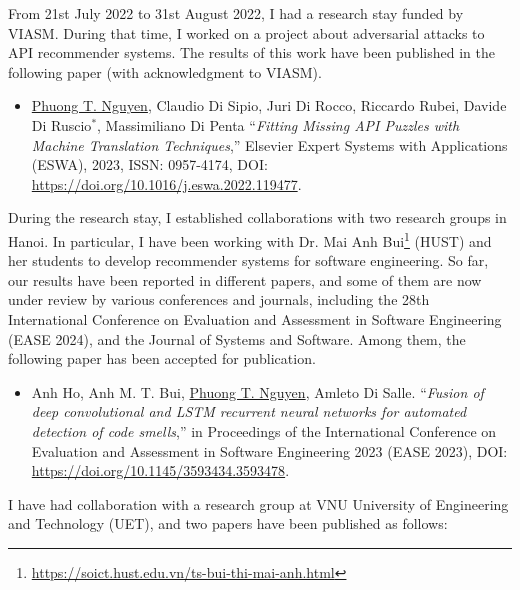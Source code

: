
From 21st July 2022 to 31st August 2022, I had a research stay funded by VIASM. During that time, I worked on a project about adversarial attacks to API recommender systems. %
The results of this work have been published in the following paper (with acknowledgment to VIASM).

\begin{itemize}
	\item %
	\underline{Phuong T. Nguyen}, Claudio Di Sipio, Juri Di Rocco, Riccardo Rubei, Davide Di Ruscio$^{*}$, Massimiliano Di Penta ``\emph{Fitting Missing API Puzzles with Machine Translation Techniques},'' Elsevier Expert Systems with Applications (ESWA), 2023, ISSN: 0957-4174, DOI: \href{https://doi.org/10.1016/j.eswa.2022.119477}{https://doi.org/10.1016/j.eswa.2022.119477}. 
\end{itemize}

During the research stay, I established collaborations with two research groups in Hanoi. In particular, I have been working with Dr. Mai Anh Bui\footnote{\url{https://soict.hust.edu.vn/ts-bui-thi-mai-anh.html}} (HUST) and her students to develop recommender systems for software engineering. So far, our results have been reported in different papers, and some of them are now under review by various conferences and journals, including the 28th International Conference on Evaluation and Assessment in Software Engineering (EASE 2024), and the Journal of Systems and Software. Among them, the following paper has been accepted for publication.

\begin{itemize}
	\item Anh Ho, Anh M. T. Bui, \underline{Phuong T. Nguyen}, Amleto Di Salle. ``\emph{Fusion of deep convolutional and LSTM recurrent neural networks for automated detection of code smells},'' in Proceedings of the International Conference on Evaluation and Assessment in Software Engineering 2023 (EASE 2023), DOI: \href{https://doi.org/10.1145/3593434.359347}{https://doi.org/10\-.1145/3593434.3593478}.	
\end{itemize}

I have had collaboration with a research group at VNU University of Engineering and Technology (UET), and two papers have been published as follows:



